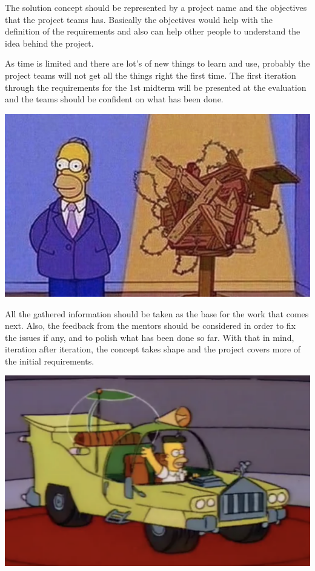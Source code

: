 The solution concept should be represented by a project name and the objectives that the project teams has.
Basically the objectives would help with the definition of the requirements and also can help other people to understand the idea behind the project.

As time is limited and there are lot's of new things to learn and use, probably the project teams will not get all the things right the first time.
The first iteration through the requirements for the 1st midterm will be presented at the evaluation and the teams should be confident on what has been done.
\vspace{0.5cm}

{ \centering \includegraphics[width=\textwidth]{images/before.png} }

All the gathered information should be taken as the base for the work that comes next. 
Also, the feedback from the mentors should be considered in order to fix the issues if any, and to polish what has been done so far.
With that in mind, iteration after iteration, the concept takes shape and the project covers more of the initial requirements.

{ \centering \includegraphics[width=\textwidth]{images/after.png} }


